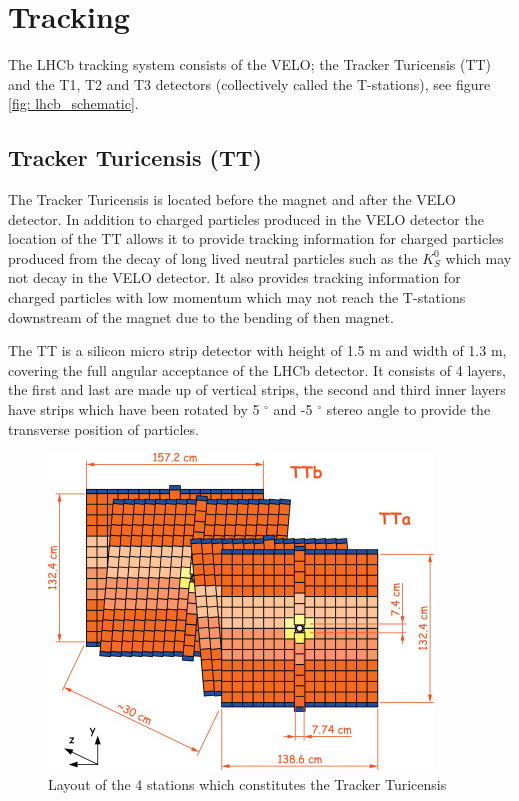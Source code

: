 \section{Tracking}
\label{section: tracking}

The LHCb tracking system consists of the VELO; the Tracker Turicensis (TT) and the T1, T2 and T3 detectors (collectively called the T-stations), see figure \ref{fig: lhcb_schematic}. 

\subsection{Tracker Turicensis (TT)}
The Tracker Turicensis is located before the magnet and after the VELO detector. In addition to charged particles produced in the VELO detector the location of the TT allows it to provide tracking information for charged particles produced from the decay of long lived neutral particles such as the $K_S^0$ which may not decay in the VELO detector. It also provides tracking information for charged particles with low momentum which may not reach the T-stations downstream of the magnet due to the bending of then magnet.

The TT is a silicon micro strip detector with height of 1.5 m and width of 1.3 m, covering the full angular acceptance of the LHCb detector. It consists of 4 layers, the first and last are made up of vertical strips, the second and third inner layers have strips which have been rotated by 5 $^\circ$ and -5 $^\circ$ stereo angle to provide the transverse position of particles.

\begin{figure}
	\centering
	\includegraphics{Chapters/detector/images/tracker_turicensis_schematic.jpg}
	\caption{Layout of the 4 stations which constitutes the Tracker Turicensis}
	\label{fig: trigger turicensis schematic}
\end{figure}

